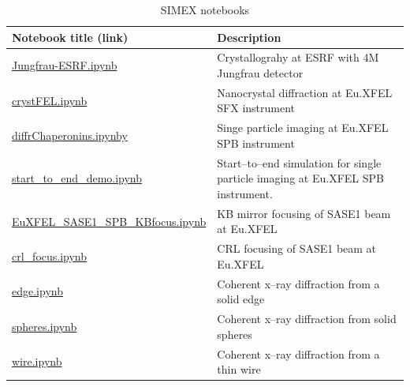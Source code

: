 \documentclass[11pt, a4paper]{article}
\begin{document}
\begin{table}[ht]
  \caption{SIMEX notebooks}
  \begin{tabular}{l|p{9.8cm}}
    \hline
    \textbf{Notebook title} (link) & \textbf{Description} \\
    \hline
    \href{https://github.com/PaNOSC-ViNYL/SimEx-notebooks/blob/main/ESRF-SerialCrystallography/Jungfrau-ESRF.ipynb}{Jungfrau-ESRF.ipynb} & Crystallograhy at ESRF with 4M Jungfrau detector\\
    \href{https://github.com/PaNOSC-ViNYL/SimEx-notebooks/blob/main/SFX/crystFEL.ipynb}{crystFEL.ipynb} &  Nanocrystal diffraction at Eu.XFEL SFX instrument \\
    \href{https://github.com/PaNOSC-ViNYL/SimEx-notebooks/blob/main/SPB/diffrChaperonins.ipynb}{diffrChaperonins.ipynby} & Singe particle imaging at Eu.XFEL SPB instrument\\
    \href{https://github.com/PaNOSC-ViNYL/SimEx-notebooks/blob/main/s2e/start_to_end_demo.ipynb}{start\_to\_end\_demo.ipynb} & Start--to--end simulation for single particle imaging at Eu.XFEL SPB instrument. \\
    \href{https://github.com/PaNOSC-ViNYL/wavefrontDB/blob/main/examples/EuXFEL_SASE1_SPB_KBfocus.ipynb}{EuXFEL\_SASE1\_SPB\_KBfocus.ipynb} & KB mirror focusing of SASE1 beam at Eu.XFEL \\
    \href{https://github.com/PaNOSC-ViNYL/wavefrontDB/blob/main/examples/crl_focus.ipynb}{crl\_focus.ipynb} & CRL focusing of SASE1 beam at Eu.XFEL \\
    \href{https://github.com/PaNOSC-ViNYL/wavefrontDB/blob/main/examples/edge.ipynb}{edge.ipynb} & Coherent x--ray diffraction from a solid edge \\
    \href{https://github.com/PaNOSC-ViNYL/wavefrontDB/blob/main/examples/spheres.ipynb}{spheres.ipynb} & Coherent x--ray diffraction from solid spheres \\
    \href{https://github.com/PaNOSC-ViNYL/wavefrontDB/blob/main/examples/wire.ipynb}{wire.ipynb} & Coherent x--ray diffraction from a thin wire \\
    \hline
  \end{tabular}
  \label{tab:simex-notebooks}
\end{table}


\end{document}

